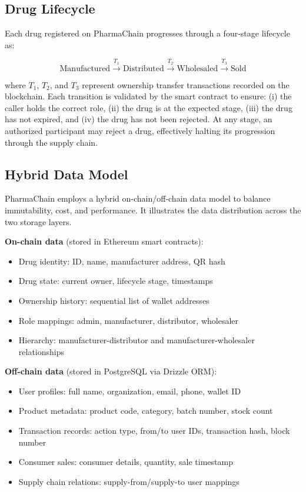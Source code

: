 \documentclass[conference]{IEEEtran}
\begin{document}
\subsection{Drug Lifecycle}

Each drug registered on PharmaChain progresses through a four-stage lifecycle as:

\begin{equation}
\text{Manufactured} \xrightarrow{T_1} \text{Distributed} \xrightarrow{T_2} \text{Wholesaled} \xrightarrow{T_3} \text{Sold}
\label{eq:lifecycle}
\end{equation}

where $T_1$, $T_2$, and $T_3$ represent ownership transfer transactions recorded on the blockchain. Each transition is validated by the smart contract to ensure: (i) the caller holds the correct role, (ii) the drug is at the expected stage, (iii) the drug has not expired, and (iv) the drug has not been rejected. At any stage, an authorized participant may reject a drug, effectively halting its progression through the supply chain.



\subsection{Hybrid Data Model}

PharmaChain employs a hybrid on-chain/off-chain data model to balance immutability, cost, and performance. It illustrates the data distribution across the two storage layers.



\textbf{On-chain data} (stored in Ethereum smart contracts):
\begin{itemize}
\item Drug identity: ID, name, manufacturer address, QR hash
\item Drug state: current owner, lifecycle stage, timestamps
\item Ownership history: sequential list of wallet addresses
\item Role mappings: admin, manufacturer, distributor, wholesaler
\item Hierarchy: manufacturer-distributor and manufacturer-wholesaler relationships
\end{itemize}

\textbf{Off-chain data} (stored in PostgreSQL via Drizzle ORM):
\begin{itemize}
\item User profiles: full name, organization, email, phone, wallet ID
\item Product metadata: product code, category, batch number, stock count
\item Transaction records: action type, from/to user IDs, transaction hash, block number
\item Consumer sales: consumer details, quantity, sale timestamp
\item Supply chain relations: supply-from/supply-to user mappings
\end{itemize}
\end{document}

